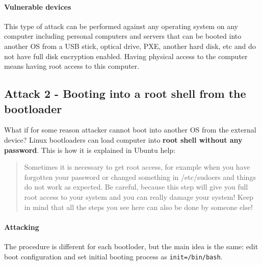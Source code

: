 \paragraph*{Vulnerable devices}
This type of attack can be performed against any operating system on any computer including personal computers and servers that can be booted into another OS from a USB stick, optical drive, PXE, another hard disk, etc and do not have full disk encryption enabled. Having physical access to the computer means having root access to this computer.

\subsection{Attack 2 - Booting into a root shell from the bootloader}
What if for some reason attacker cannot boot into another OS from the external device? Linux bootloaders can load computer into \textbf{root shell without any password}. This is how it is explained in Ubuntu help:
\begin{quote}
Sometimes it is necessary to get root access, for example when you have forgotten your password or changed something in /etc/sudoers and things do not work as expected.  Be careful, because this step will give you full root access to your system and you can really damage your system! Keep in mind that all the steps you see here can also be done by someone else!~\cite{bootloader-reset-root} 
\end{quote}

\paragraph*{Attacking}
The procedure is different for each bootloder, but the main idea is the same: edit boot configuration and set initial booting process as \texttt{init=/bin/bash}.

